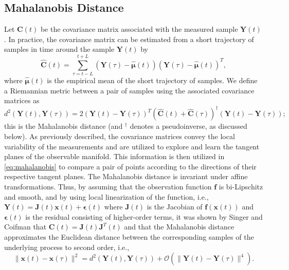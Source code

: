 \documentclass[aip,jcp,preprint]{revtex4-1}
\begin{document}
\subsection{Mahalanobis Distance}
\label{subsec:mahalanobis}

Let $\mathbf{C}(t)$ be the covariance matrix associated with the measured sample $\mathbf{Y}(t)$. In practice, the covariance matrix can be estimated from a short trajectory of samples in time around the sample $\mathbf{Y}(t)$ by
\begin{equation}
	\widehat{\mathbf{C}}(t) = \sum \limits _{\tau = t-L}^{t+L} (\mathbf{Y}(\tau) - \widehat{\boldsymbol{\mu}}(t))(\mathbf{Y}(\tau) - \widehat{\boldsymbol{\mu}}(t))^T,
	\label{eq:cov}
\end{equation}
where $\widehat{\boldsymbol{\mu}}(t)$ is the empirical mean of the short trajectory of samples.
%
We define a Riemannian metric between a pair of samples using the associated covariance matrices as
\begin{equation}
	d^2(\mathbf{Y}(t), \mathbf{Y}(\tau)) = 2 (\mathbf{Y}(t) - \mathbf{Y}(\tau))^T(\widehat{\mathbf{C}}(t) + \widehat{\mathbf{C}}(\tau))^{\dagger}(\mathbf{Y}(t) - \mathbf{Y}(\tau));
	\label{eq:mahalanobis}
\end{equation}
this is the Mahalanobis distance (and $^{\dagger}$ denotes a pseudoinverse, as discussed below).
%
As previously described, the covariance matrices convey the local variability of the measurements and are utilized to explore and learn the tangent planes of the observable manifold.
%
This information is then utilized in \eqref{eq:mahalanobis} to compare a pair of points according to the directions of their respective tangent planes.
%
The Mahalanobis distance is invariant under affine transformations.
%
Thus, by assuming that the observation function $\mathbf{f}$ is bi-Lipschitz and smooth, and by using local linearization of the function, i.e., $\mathbf{Y}(t) = \mathbf{J}(t) \mathbf{x}(t) + \boldsymbol{\epsilon}(t)$ where $\mathbf{J}(t)$ is the Jacobian of $\mathbf{f}(\mathbf{x}(t))$ and $\boldsymbol{\epsilon}(t)$ is the residual consisting of higher-order terms, it was shown by Singer and Coifman \cite{singer2008non} that $\mathbf{C}(t) = \mathbf{J}(t)\mathbf{J}^T(t)$ and that the Mahalanobis distance approximates the Euclidean distance between the corresponding samples of the underlying process to second order, i.e.,
\begin{equation}
	\| \mathbf{x}(t) - \mathbf{x}(\tau) \|^2 = d^2(\mathbf{Y}(t), \mathbf{Y}(\tau)) + \mathcal{O}(\| \mathbf{Y}(t) - \mathbf{Y}(\tau)\|^4).
\end{equation}
\end{document}

